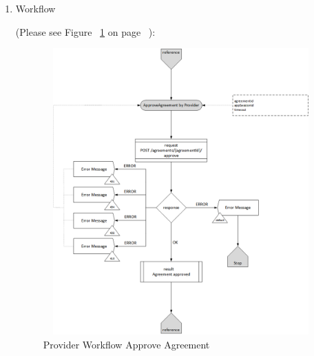 \begin{enumerate}

\item Workflow

(Please see Figure ~\ref{fig:PAA} on page ~\pageref{fig:PAA}):

\begin{figure}[htbp]
    \centering
    \includegraphics[width=11cm,height=11cm,angle=0]{./diag/Workflow/Market/ApproveAgreement-P-Workflow.png}
    \caption{Provider Workflow Approve Agreement  }
	\label{fig:PAA}
\end{figure}

\end{enumerate}

\newpage



